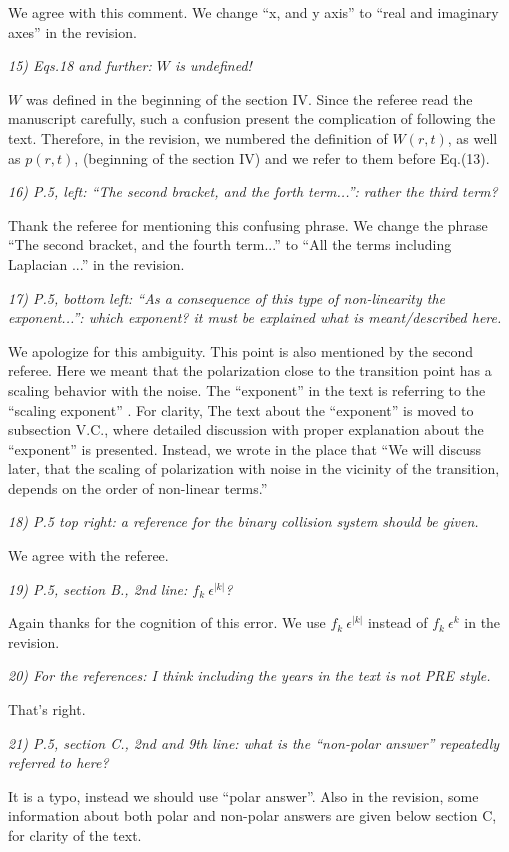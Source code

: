 \documentclass[a4paper,11pt]{letter}
\newcommand{\w}{W}
\newcommand{\rf}[1]{\textit{\textcolor{hlcolor}{#1}}}
\begin{document}
We agree with this comment. We change ``x, and y axis'' to ``real and imaginary axes'' in the revision.

\rf{15) Eqs.18 and further: $W$ is undefined!}

$\w$ was defined in the beginning of the section IV. Since the referee read the manuscript carefully, such a confusion present the complication of following the text. Therefore, in the revision, we numbered the definition of $W(r,t)$, as well as $p(r,t)$, (beginning of the section IV) and we refer to them before Eq.(13).

\rf{16) P.5, left: ``The second bracket, and the forth term...'': rather the third term?}

Thank the referee for mentioning this confusing phrase. We change the phrase ``The second bracket, and the fourth term...'' to ``All the terms including Laplacian ...'' in the revision.

\rf{17) P.5, bottom left: ``As a consequence of this type of non-linearity the exponent...'': which exponent? it must be explained what is meant/described here.}

We apologize for this ambiguity. This point is also mentioned by the second referee. Here we meant that the polarization close to the transition point has a scaling behavior with the noise. The ``exponent'' in the text is referring to the ``scaling exponent'' . For clarity, The text about the ``exponent'' is moved to subsection V.C., where detailed discussion with proper explanation about the ``exponent'' is presented. Instead, we wrote in the place that ``We will discuss later, that the scaling of polarization with noise in the vicinity of the transition, depends on the order of non-linear terms.''

\rf{18) P.5 top right: a reference for the binary collision system should be given.}

We agree with the referee.

\rf{19) P.5, section B., 2nd line: $f_k~\epsilon^{|k|}$?}

Again thanks for the cognition of this error. We use $f_k~\epsilon^{|k|}$ instead of $f_k~\epsilon^k$ in the revision.

\rf{20) For the references: I think including the years in the text is not PRE style.}

That's right.

\rf{21) P.5, section C., 2nd and 9th line: what is the ``non-polar answer'' repeatedly referred to here?}

It is a typo, instead we should use ``polar answer''. Also in the revision, some information about both polar and non-polar answers are given below section C, for clarity of the text. 
\end{document}
